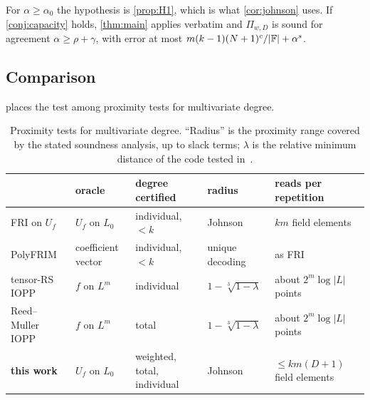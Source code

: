 For $\alpha\ge\alpha_0$ the hypothesis is \cref{prop:H1}, which is what \cref{cor:johnson}
uses. If \cref{conj:capacity} holds, \cref{thm:main} applies verbatim and $\Pi_{w,D}$ is sound
for agreement $\alpha\ge\rho+\gamma$, with error at most $m(k-1)(N+1)^{c}/|\mathbb{F}|+\alpha^s$.

\subsection{Comparison}\label{sec:intro-comparison}

 places the test among proximity tests for multivariate degree.

\begin{table}[t]
\centering\footnotesize
\renewcommand{\arraystretch}{1.2}
\begin{tabular}{@{}p{3.1cm}p{2.1cm}p{2.6cm}p{2.9cm}p{3.0cm}@{}}
\hline
 & oracle & degree certified & radius & reads per repetition\\
\hline
FRI on $U_f$ \cite{BBHR18,BCIKS20} & $U_f$ on $L_0$ & individual, $<k$ & Johnson & $km$ field elements\\
PolyFRIM \cite{PolyFRIM} & coefficient vector & individual, $<k$ & unique decoding & as FRI\\
tensor-RS IOPP \cite{ABN23} & $f$ on $L^m$ & individual & $1-\sqrt[3]{1-\lambda}$ & about $2^m\log|L|$ points\\
Reed--Muller IOPP \cite{ABN23} & $f$ on $L^m$ & total & $1-\sqrt[3]{1-\lambda}$ & about $2^m\log|L|$ points\\
\textbf{this work} & $U_f$ on $L_0$ & weighted, total, individual & Johnson & $\le km(D+1)$ field elements\\
\hline
\end{tabular}
\caption{Proximity tests for multivariate degree. ``Radius'' is the proximity range covered
by the stated soundness analysis, up to slack terms; $\lambda$ is the relative minimum
distance of the code tested in~\cite{ABN23}.}
\label{tab:comparison}
\end{table}

